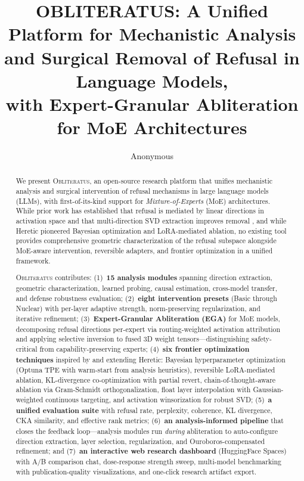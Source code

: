 \documentclass[11pt]{article}
\title{OBLITERATUS: A Unified Platform for Mechanistic Analysis\\and Surgical Removal of Refusal in Language Models,\\with Expert-Granular Abliteration for MoE Architectures}
\author{
    Anonymous
}
\date{}
\begin{document}
\maketitle

\begin{abstract}
We present \textsc{Obliteratus}, an open-source research platform that unifies mechanistic analysis and surgical intervention of refusal mechanisms in large language models (LLMs), with first-of-its-kind support for \emph{Mixture-of-Experts} (MoE) architectures.
While prior work has established that refusal is mediated by linear directions in activation space \citep{arditi2024refusal} and that multi-direction SVD extraction improves removal \citep{gabliteration2024}, and while Heretic \citep{heretic2025} pioneered Bayesian optimization and LoRA-mediated ablation, no existing tool provides comprehensive geometric characterization of the refusal subspace alongside MoE-aware intervention, reversible adapters, and frontier optimization in a unified framework.

\textsc{Obliteratus} contributes:
(1)~\textbf{15 analysis modules} spanning direction extraction, geometric characterization, learned probing, causal estimation, cross-model transfer, and defense robustness evaluation;
(2)~\textbf{eight intervention presets} (Basic through Nuclear) with per-layer adaptive strength, norm-preserving regularization, and iterative refinement;
(3)~\textbf{Expert-Granular Abliteration (EGA)} for MoE models, decomposing refusal directions per-expert via routing-weighted activation attribution and applying selective inversion to fused 3D weight tensors---distinguishing safety-critical from capability-preserving experts;
(4)~\textbf{six frontier optimization techniques} inspired by and extending Heretic: Bayesian hyperparameter optimization (Optuna TPE with warm-start from analysis heuristics), reversible LoRA-mediated ablation, KL-divergence co-optimization with partial revert, chain-of-thought-aware ablation via Gram-Schmidt orthogonalization, float layer interpolation with Gaussian-weighted continuous targeting, and activation winsorization for robust SVD;
(5)~\textbf{a unified evaluation suite} with refusal rate, perplexity, coherence, KL divergence, CKA similarity, and effective rank metrics;
(6)~\textbf{an analysis-informed pipeline} that closes the feedback loop---analysis modules run \emph{during} abliteration to auto-configure direction extraction, layer selection, regularization, and Ouroboros-compensated refinement; and
(7)~\textbf{an interactive web research dashboard} (HuggingFace Spaces) with A/B comparison chat, dose-response strength sweep, multi-model benchmarking with publication-quality visualizations, and one-click research artifact export.


\end{abstract}
\end{document}
